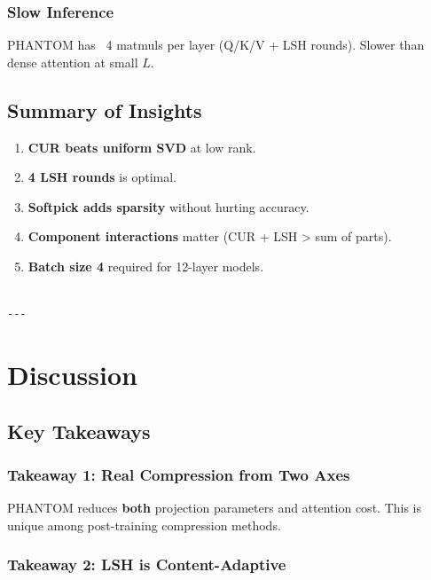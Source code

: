 \subsubsection{Slow Inference}

PHANTOM has ~4 matmuls per layer (Q/K/V + LSH rounds). Slower than dense 
attention at small $L$.

\subsection{Summary of Insights}

\begin{enumerate}
\item \textbf{CUR beats uniform SVD} at low rank.
\item \textbf{4 LSH rounds} is optimal.
\item \textbf{Softpick adds sparsity} without hurting accuracy.
\item \textbf{Component interactions} matter (CUR + LSH \textgreater{} sum of parts).
\item \textbf{Batch size 4} required for 12-layer models.
\end{enumerate}
\begin{lstlisting}

---
\end{lstlisting}


\section{Discussion}

\subsection{Key Takeaways}

\subsubsection{Takeaway 1: Real Compression from Two Axes}

PHANTOM reduces \textbf{both} projection parameters and attention cost. This is 
unique among post-training compression methods.

\subsubsection{Takeaway 2: LSH is Content-Adaptive}

